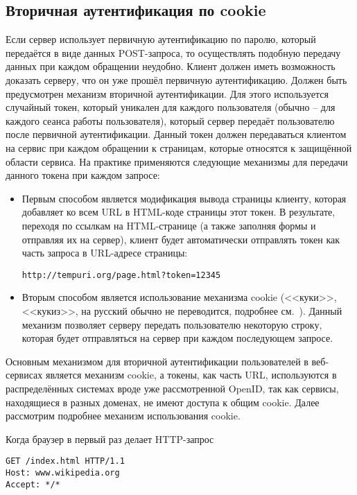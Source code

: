 \subsection{Вторичная аутентификация по cookie}

Если сервер использует первичную аутентификацию по паролю, который передаётся в виде данных POST-запроса, то осуществлять подобную передачу данных при каждом обращении неудобно. Клиент должен иметь возможность доказать серверу, что он уже прошёл первичную аутентификацию. Должен быть предусмотрен механизм вторичной аутентификации. Для этого используется случайный токен, который уникален для каждого пользователя (обычно -- для каждого сеанса работы пользователя), который сервер передаёт пользователю после первичной аутентификации. Данный токен должен передаваться клиентом на сервис при каждом обращении к страницам, которые относятся к защищённой области сервиса. На практике применяются следующие механизмы для передачи данного токена при каждом запросе:

\begin{itemize}
	\item Первым способом является модификация вывода страницы клиенту, которая добавляет ко всем URL в HTML-коде страницы этот токен. В результате, переходя по ссылкам на HTML-странице (а также заполняя формы и отправляя их на сервер), клиент будет автоматически отправлять токен как часть запроса в URL-адресе страницы:

\texttt{http://tempuri.org/page.html?token=12345}
	\item Вторым способом является использование механизма cookie (<<куки>>, <<кукиз>>, на русский обычно не переводится, подробнее см.~\cite[Client Identification and Cookies]{Totty:2002}). Данный механизм позволяет серверу передать пользователю некоторую строку, которая будет отправляться на сервер при каждом последующем запросе.
\end{itemize}

Основным механизмом для вторичной аутентификации пользователей в веб-сервисах является механизм cookie, а токены, как часть URL, используются в распределённых системах вроде уже рассмотренной OpenID, так как сервисы, находящиеся в разных доменах, не имеют доступа к общим cookie. Далее рассмотрим подробнее механизм использования cookie.

Когда браузер в первый раз делает HTTP-запрос
\begin{center} \begin{verbatim}
GET /index.html HTTP/1.1
Host: www.wikipedia.org
Accept: */*
\end{verbatim} \end{center}

